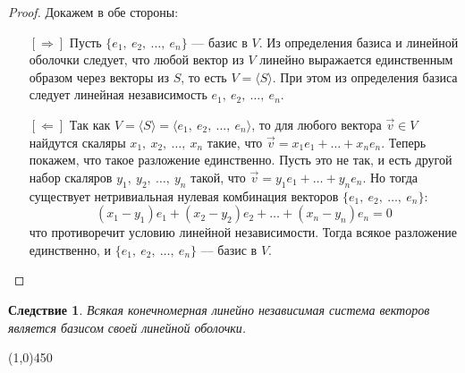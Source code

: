 \documentclass[a4paper,12pt]{article}
\newtheorem*{consequence}{Следствие}
\begin{document}
	\begin{proof} Докажем в обе стороны:
		\begin{itemize}
			\item[{$[\Rightarrow]$}] Пусть $\{e_1,\ e_2,\ \ldots,\ e_n\}$ --- базис в $V$. Из определения базиса и линейной оболочки следует, что любой вектор из $V$ линейно выражается единственным образом через векторы из $S$, то есть $V = \langle S \rangle$. При этом из определения базиса следует линейная независимость $e_1,\ e_2,\ \ldots,\ e_n$.
			
			\item[{$[\Leftarrow]$}] Так как $V = \langle S \rangle = \langle e_1,\ e_2,\ \ldots,\ e_n \rangle$, то для любого вектора $\vec{v} \in V$ найдутся скаляры $x_1,\ x_2,\ \ldots,\ x_n$ такие, что $\vec{v} = x_1e_1 + \ldots + x_ne_n$. Теперь покажем, что такое разложение единственно. Пусть это не так, и есть другой набор скаляров $y_1,\ y_2,\ \ldots,\ y_n$ такой, что $\vec{v} = y_1e_1 + \ldots + y_ne_n$. Но тогда существует нетривиальная нулевая комбинация векторов $\{e_1,\ e_2,\ \ldots,\ e_n\}$:
			\[(x_1 - y_1)e_1 + (x_2 - y_2)e_2 + \ldots + (x_n - y_n)e_n = 0\]
			что противоречит условию линейной независимости. Тогда всякое разложение единственно, и $\{e_1,\ e_2,\ \ldots,\ e_n\}$ --- базис в $V$.
		\end{itemize}
	\end{proof}
	\begin{consequence}
		Всякая конечномерная линейно независимая система векторов является базисом своей линейной оболочки.
	\end{consequence}
	\begin{center}
		\line(1,0){450}
	\end{center}
\end{document}
